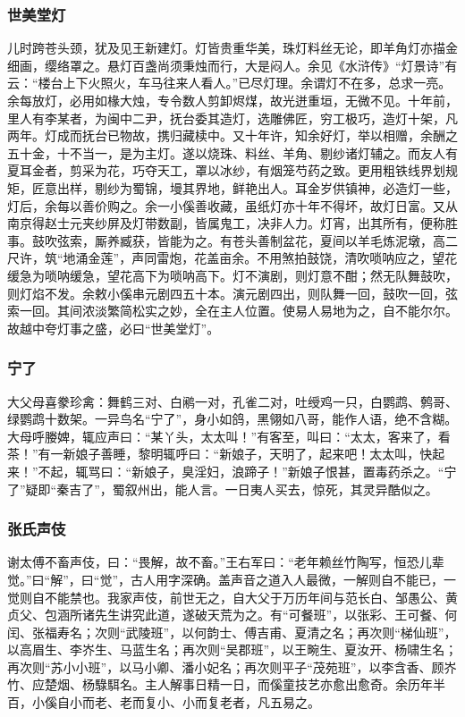 \documentclass[]{article}
\begin{document}
\hypertarget{header-n322}{%
\subsubsection{世美堂灯}\label{header-n322}}

儿时跨苍头颈，犹及见王新建灯。灯皆贵重华美，珠灯料丝无论，即羊角灯亦描金细画，缨络罩之。悬灯百盏尚须秉烛而行，大是闷人。余见《水浒传》``灯景诗''有云：``楼台上下火照火，车马往来人看人。''已尽灯理。余谓灯不在多，总求一亮。余每放灯，必用如椽大烛，专令数人剪卸烬煤，故光迸重垣，无微不见。十年前，里人有李某者，为闽中二尹，抚台委其造灯，选雕佛匠，穷工极巧，造灯十架，凡两年。灯成而抚台已物故，携归藏椟中。又十年许，知余好灯，举以相赠，余酬之五十金，十不当一，是为主灯。遂以烧珠、料丝、羊角、剔纱诸灯辅之。而友人有夏耳金者，剪采为花，巧夺天工，罩以冰纱，有烟笼芍药之致。更用粗铁线界划规矩，匠意出样，剔纱为蜀锦，墁其界地，鲜艳出人。耳金岁供镇神，必造灯一些，灯后，余每以善价购之。余一小傒善收藏，虽纸灯亦十年不得坏，故灯日富。又从南京得赵士元夹纱屏及灯带数副，皆属鬼工，决非人力。灯宵，出其所有，便称胜事。鼓吹弦索，厮养臧获，皆能为之。有苍头善制盆花，夏间以羊毛炼泥墩，高二尺许，筑``地涌金莲''，声同雷炮，花盖亩余。不用煞拍鼓饶，清吹唢呐应之，望花缓急为唢呐缓急，望花高下为唢呐高下。灯不演剧，则灯意不酣；然无队舞鼓吹，则灯焰不发。余敕小傒串元剧四五十本。演元剧四出，则队舞一回，鼓吹一回，弦索一回。其间浓淡繁简松实之妙，全在主人位置。使易人易地为之，自不能尔尔。故越中夸灯事之盛，必曰``世美堂灯''。

\hypertarget{header-n327}{%
\subsubsection{宁了}\label{header-n327}}

大父母喜豢珍禽：舞鹤三对、白鹇一对，孔雀二对，吐绶鸡一只，白鹦鹉、鹩哥、绿鹦鹉十数架。一异鸟名``宁了''，身小如鸽，黑翎如八哥，能作人语，绝不含糊。大母呼媵婢，辄应声曰：``某丫头，太太叫！''有客至，叫曰：``太太，客来了，看茶！''有一新娘子善睡，黎明辄呼曰：``新娘子，天明了，起来吧！太太叫，快起来！''不起，辄骂曰：``新娘子，臭淫妇，浪蹄子！''新娘子恨甚，置毒药杀之。``宁了''疑即``秦吉了''，蜀叙州出，能人言。一日夷人买去，惊死，其灵异酷似之。

\hypertarget{header-n332}{%
\subsubsection{张氏声伎}\label{header-n332}}

谢太傅不畜声伎，曰：``畏解，故不畜。''王右军曰：``老年赖丝竹陶写，恒恐儿辈觉。''曰``解''，曰``觉''，古人用字深确。盖声音之道入人最微，一解则自不能已，一觉则自不能禁也。我家声伎，前世无之，自大父于万历年间与范长白、邹愚公、黄贞父、包涵所诸先生讲究此道，遂破天荒为之。有``可餐班''，以张彩、王可餐、何闰、张福寿名；次则``武陵班''，以何韵士、傅吉甫、夏清之名；再次则``梯仙班''，以高眉生、李岕生、马蓝生名；再次则``吴郡班''，以王畹生、夏汝开、杨啸生名；再次则``苏小小班''，以马小卿、潘小妃名；再次则平子``茂苑班''，以李含香、顾岕竹、应楚烟、杨騄駬名。主人解事日精一日，而傒童技艺亦愈出愈奇。余历年半百，小傒自小而老、老而复小、小而复老者，凡五易之。
\end{document}
